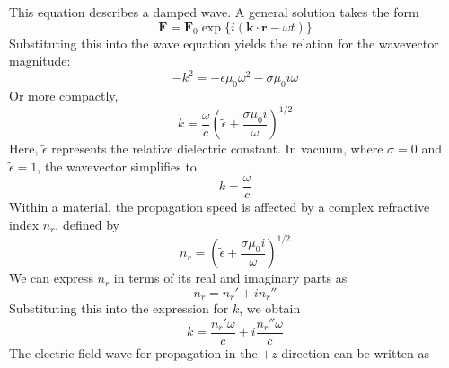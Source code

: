 This equation describes a damped wave. A general solution takes the form
\begin{equation}
	\mathbf{F} = \mathbf{F}_0 \exp \{ i(\mathbf{k} \cdot \mathbf{r} - \omega t) \}
\end{equation}
Substituting this into the wave equation yields the relation for the wavevector magnitude:
\begin{equation}
	-k^2 = -\epsilon \mu_0 \omega^2 - \sigma \mu_0 i \omega
\end{equation}
Or more compactly,
\begin{equation}
	k = \frac{\omega}{c} \left( \tilde{\epsilon} + \frac{\sigma \mu_0 i}{\omega} \right)^{1/2}
\end{equation}
Here, \( \tilde{\epsilon} \) represents the relative dielectric constant. In vacuum, where \( \sigma = 0 \) and \( \tilde{\epsilon} = 1 \), the wavevector simplifies to
\begin{equation}
	k = \frac{\omega}{c}
\end{equation}
Within a material, the propagation speed is affected by a complex refractive index \( n_r \), defined by
\begin{equation}
	n_r = \left( \tilde{\epsilon} + \frac{\sigma \mu_0 i}{\omega} \right)^{1/2}
\end{equation}
We can express \( n_r \) in terms of its real and imaginary parts as
\begin{equation}
	n_r = n_r' + i n_r''
\end{equation}
Substituting this into the expression for \( k \), we obtain
\begin{equation}
	k = \frac{n_r' \omega}{c} + i \frac{n_r'' \omega}{c}
\end{equation}
The electric field wave for propagation in the \( +z \) direction can be written as

